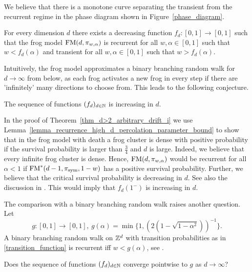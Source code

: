 We believe that there is a monotone curve separating the transient from the recurrent regime in the phase diagram shown in Figure~\ref{phase_diagram}.

\begin{con}\label{con_critical_curve}
For every dimension $d$ there exists a decreasing function $f_d \colon [0,1] \to [0,1]$ such that the frog model $\operatorname{FM}(d,\pi_{w,\alpha})$ is recurrent for all $w,\alpha \in [0,1]$ such that $w<f_d(\alpha)$ and transient for all $w,\alpha \in [0,1]$ such that $w>f_d(\alpha)$.
\end{con}

Intuitively, the frog model approximates a binary branching random walk for $d \to \infty$ from below, as each frog activates a new frog in every step if there are 'infinitely' many directions to choose from. This leads to the following conjecture.

\begin{con}\label{con_high_d}
 The sequence of functions $(f_d)_{d \in \mathbb{N}}$ is increasing in $d$.
\end{con}

In the proof of Theorem~\ref{thm_d>2_arbitrary_drift_i} we use Lemma~\ref{lemma_recurrence_high_d_percolation_parameter_bound} to show that in the frog model with death a frog cluster is dense with positive probability if the survival probability is larger than $\frac34$ and $d$ is large. 
Indeed, we believe that every infinite frog cluster is dense. Hence, $\operatorname{FM}(d,\pi_{w,\alpha})$ would be recurrent for all $\alpha<1$ if $\operatorname{FM}^*(d-1,\pi_{\text{sym}},1-w)$ has a positive survival probability. Further, we believe that the critical survival probability is decreasing in $d$. See also the discussion in \cite[Chapter~1.2]{AMP02pt}. This would imply that $f_d(1^{-})$ is increasing in $d$.

The comparison with a binary branching random walk raises another question.  Let 
\begin{equation*}
 g \colon [0,1] \to [0,1],\ g(\alpha) = \min\bigl\{1, (2(1-\sqrt{1-\alpha^2}))^{-1}\bigr\}.
\end{equation*}
A binary branching random walk on $\mathbb{Z}^d$ with transition probabilities as in \eqref{transition_function} is recurrent iff $w < g(\alpha)$, see \cite[Section~4]{GM06}. 

\begin{question}
Does the sequence of functions $(f_d)_{d \in \mathbb{N}}$ converge pointwise to $g$ as $d \to \infty$?
\end{question}

